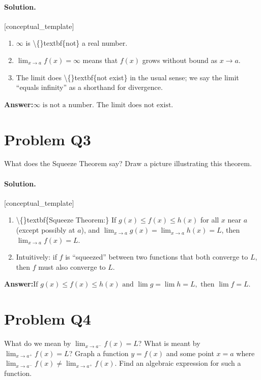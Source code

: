 \documentclass[11pt,a4paper]{article}
\newcommand{\solvertag}[1]{{\footnotesize\color{gray}\textsf{[#1]}}}
\begin{document}
\paragraph{Solution.} \solvertag{conceptual\_template} 

\begin{enumerate}[leftmargin=*]
  \item $\infty$ is \textbackslash\{\}textbf\{not\} a real number.
  \item $\lim_{x \to a} f(x) = \infty$ means that $f(x)$ grows without bound as $x \to a$.
  \item The limit does \textbackslash\{\}textbf\{not exist\} in the usual sense; we say the limit ``equals infinity'' as a shorthand for divergence.
\end{enumerate}

\noindent\textbf{Answer:}\quad $\infty \text{ is not a number. The limit does not exist.}$

\medskip

\section*{Problem Q3}
What does the Squeeze Theorem say? Draw a picture illustrating this theorem.

\paragraph{Solution.} \solvertag{conceptual\_template} 

\begin{enumerate}[leftmargin=*]
  \item \textbackslash\{\}textbf\{Squeeze Theorem:\} If $g(x) \le f(x) \le h(x)$ for all $x$ near $a$ (except possibly at $a$), and $\lim_{x \to a} g(x) = \lim_{x \to a} h(x) = L$, then $\lim_{x \to a} f(x) = L$.
  \item Intuitively: if $f$ is ``squeezed'' between two functions that both converge to $L$, then $f$ must also converge to $L$.
\end{enumerate}

\noindent\textbf{Answer:}\quad $\text{If } g(x) \le f(x) \le h(x) \text{ and } \lim g = \lim h = L, \text{ then } \lim f = L.$

\medskip

\section*{Problem Q4}
What do we mean by $\lim_{x \to a^-} f(x) = L$? What is meant by $\lim_{x \to a^+} f(x) = L$? Graph a function $y = f(x)$ and some point $x = a$ where $\lim_{x \to a^-} f(x) \neq \lim_{x \to a^+} f(x)$. Find an algebraic expression for such a function.
\end{document}
